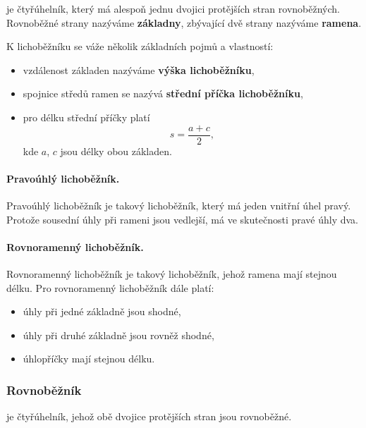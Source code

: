 \documentclass[12pt,a4paper]{article}
\begin{document}
\begin{definitionbox}
 je čtyřúhelník, který má alespoň jednu dvojici protějších stran rovnoběžných.
Rovnoběžné strany nazýváme \textbf{základny}, zbývající dvě strany nazýváme \textbf{ramena}.
\end{definitionbox}

K lichoběžníku se váže několik základních pojmů a vlastností:

\begin{itemize}
    \item vzdálenost základen nazýváme \textbf{výška lichoběžníku},
    \item spojnice středů ramen se nazývá \textbf{střední příčka lichoběžníku},
    \item pro délku střední příčky platí
    \[
        s = \frac{a+c}{2},
    \]
    kde $a$, $c$ jsou délky obou základen.
\end{itemize}

\paragraph{Pravoúhlý lichoběžník.}
Pravoúhlý lichoběžník je takový lichoběžník, který má jeden vnitřní úhel pravý.
Protože sousední úhly při rameni jsou vedlejší, má ve skutečnosti pravé úhly dva.

\paragraph{Rovnoramenný lichoběžník.}
Rovnoramenný lichoběžník je takový lichoběžník, jehož ramena mají stejnou délku.
Pro rovnoramenný lichoběžník dále platí:

\begin{itemize}
    \item úhly při jedné základně jsou shodné,
    \item úhly při druhé základně jsou rovněž shodné,
    \item úhlopříčky mají stejnou délku.
\end{itemize}

\subsubsection{Rovnoběžník}

\begin{definitionbox}
 je čtyřúhelník, jehož obě dvojice protějších stran jsou rovnoběžné.
\end{definitionbox}
\end{document}
